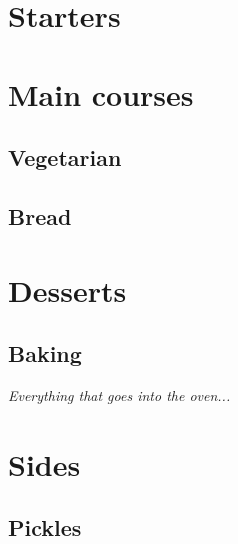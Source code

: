 \documentclass[11pt,paper=a4]{scrbook}
\begin{document}


\tableofcontents                        %


\part{Starters}

\part{Main courses}
\chapter{Vegetarian}

\chapter{Bread}


\part{Desserts}
\chapter{Baking}
\textit{Everything that goes into the oven...} %




\part{Sides}
\chapter{Pickles}


\end{document}
